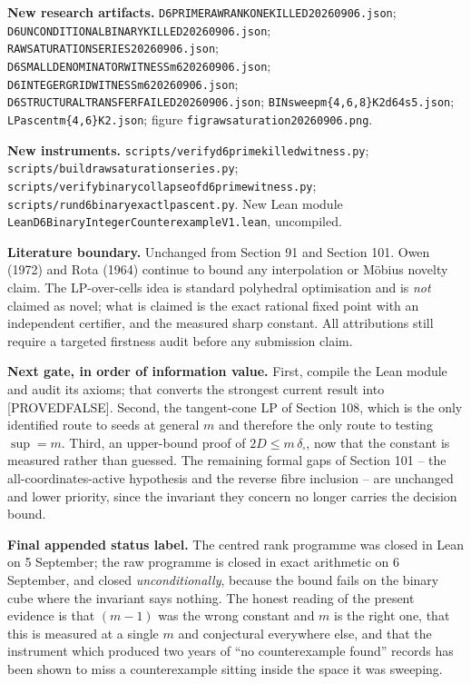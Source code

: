 \documentclass[9pt,twocolumn]{article}
\newcommand{\eclass}[1]{\textsf{[#1]}}
\renewcommand{\_}{\CIGunderscore\allowbreak}
\begin{document}
\textbf{New research artifacts.} \texttt{D6PRIME\_RAW\_RANKONE\_KILLED\_20260906.json}; \texttt{D6\_UNCONDITIONAL\_BINARY\_KILLED\_20260906.json}; \texttt{RAW\_SATURATION\_SERIES\_20260906.json}; \texttt{D6\_SMALL\_DENOMINATOR\_WITNESS\_m6\_20260906.json}; \texttt{D6\_INTEGER\_GRID\_WITNESS\_m6\_20260906.json}; \texttt{D6\_STRUCTURAL\_TRANSFER\_FAILED\_20260906.json}; \texttt{BINsweep\_m\{4,6,8\}\_K2\_d64\_s5.json}; \texttt{LPascent\_m\{4,6\}\_K2\_*.json}; figure \texttt{fig\_raw\_saturation\_20260906.png}.

\textbf{New instruments.} \texttt{scripts/verify\_d6prime\_killed\_witness.py}; \texttt{scripts/build\_raw\_saturation\_series.py}; \texttt{scripts/verify\_binary\_collapse\_of\_d6prime\_witness.py}; \texttt{scripts/run\_d6\_binary\_exact\_lp\_ascent.py}. New Lean module \texttt{LeanD6BinaryIntegerCounterexampleV1.lean}, uncompiled.

\textbf{Literature boundary.} Unchanged from Section 91 and Section 101. Owen (1972) and Rota (1964) continue to bound any interpolation or M\"obius novelty claim. The LP-over-cells idea is standard polyhedral optimisation and is \emph{not} claimed as novel; what is claimed is the exact rational fixed point with an independent certifier, and the measured sharp constant. All attributions still require a targeted firstness audit before any submission claim.

\textbf{Next gate, in order of information value.} First, compile the Lean module and audit its axioms; that converts the strongest current result into \eclass{PROVED\_FALSE}. Second, the tangent-cone LP of Section 108, which is the only identified route to seeds at general $m$ and therefore the only route to testing $\sup=m$. Third, an upper-bound proof of $2D\le m\,\delta_{\square}$, now that the constant is measured rather than guessed. The remaining formal gaps of Section 101 -- the all-coordinates-active hypothesis and the reverse fibre inclusion -- are unchanged and lower priority, since the invariant they concern no longer carries the decision bound.

\textbf{Final appended status label.} The centred rank programme was closed in Lean on 5 September; the raw programme is closed in exact arithmetic on 6 September, and closed \emph{unconditionally}, because the bound fails on the binary cube where the invariant says nothing. The honest reading of the present evidence is that $(m-1)$ was the wrong constant and $m$ is the right one, that this is measured at a single $m$ and conjectural everywhere else, and that the instrument which produced two years of ``no counterexample found'' records has been shown to miss a counterexample sitting inside the space it was sweeping.
\end{document}
